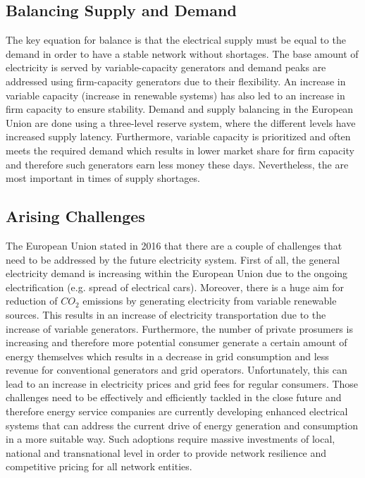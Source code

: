 \documentclass[runningheads]{llncs}
\begin{document}
\subsection{Balancing Supply and Demand}
The key equation for balance is that the electrical supply must be equal to the demand in order to have a stable network without shortages. The base amount of electricity is served by variable-capacity generators and demand peaks are addressed using firm-capacity generators due to their flexibility. An increase in variable capacity (increase in renewable systems) has also led to an increase in firm capacity to ensure stability. Demand and supply balancing in the European Union are done using a three-level reserve system, where the different levels have increased supply latency. Furthermore, variable capacity is prioritized and often meets the required demand which results in lower market share for firm capacity and therefore such generators earn less money these days. Nevertheless, the are most important in times of supply shortages. \cite{eu_energy_market}

\subsection{Arising Challenges}
The European Union \cite{eu_energy_market} stated in 2016 that there are a couple of challenges that need to be addressed by the future electricity system. First of all, the general electricity demand is increasing within the European Union due to the ongoing electrification (e.g. spread of electrical cars). Moreover, there is a huge aim for reduction of $CO_2$ emissions by generating electricity from variable renewable sources. This results in an increase of electricity transportation due to the increase of variable generators.\newline
Furthermore, the number of private prosumers is increasing and therefore more potential consumer generate a certain amount of energy themselves which results in a decrease in grid consumption and less revenue for conventional generators and grid operators. Unfortunately, this can lead to an increase in electricity prices and grid fees for regular consumers. \newline
Those challenges need to be effectively and efficiently tackled in the close future and therefore energy service companies are currently developing enhanced electrical systems that can address the current drive of energy generation and consumption in a more suitable way. Such adoptions require massive investments of local, national and transnational level in order to provide network resilience and competitive pricing for all network entities.\cite{eu_energy_market}
\end{document}
